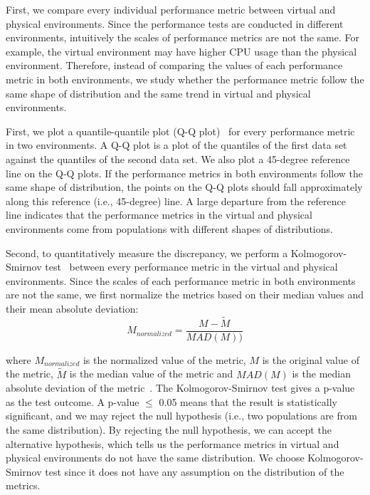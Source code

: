 First, we compare every individual performance metric between virtual and physical environments. Since the performance tests are conducted in different environments, intuitively the scales of performance metrics are not the same. For example, the virtual environment may have higher CPU usage than the physical environment. Therefore, instead of comparing the values of each performance metric in both environments, we study whether the performance metric follow the same shape of distribution and the same trend in virtual and physical environments. 

First, we plot a quantile-quantile plot (Q-Q plot)~\cite{qqplots} for every performance metric in two environments. A Q-Q plot is a plot of the quantiles of the first data set against the quantiles of the second data set. We also plot a 45-degree reference line on the Q-Q plots. If the performance metrics in both environments follow the same shape of distribution, the points on the Q-Q plots should fall approximately along this reference (i.e., 45-degree) line. A large departure from the reference line indicates that the performance metrics in the virtual and physical environments come from populations with different shapes of distributions. 

Second, to quantitatively measure the discrepancy, we perform a Kolmogorov-Smirnov test~\cite{kstest} between every performance metric in the virtual and physical environments. Since the scales of each performance metric in both environments are not the same, we first normalize the metrics based on their median values and their mean absolute deviation: 
\begin{equation}
	\label{equ:mad}
		M_{normalized}=\frac{M-\tilde{M}}{MAD(M))}		
\end{equation}
	
where $M_{normalized}$ is the normalized value of the metric, $M$ is the original value of the metric, $\tilde{M}$ is the median value of the metric and $MAD(M)$ is the median absolute deviation of the metric~\cite{walker1929studies}. The Kolmogorov-Smirnov test gives a p-value as the test outcome. A p-value $\leq$ 0.05 means that the result is statistically significant, and we may reject the null hypothesis (i.e., two populations are from the same distribution). By rejecting the null hypothesis, we can accept the alternative hypothesis, which tells us the performance metrics in virtual and physical environments do not have the same distribution. We choose Kolmogorov-Smirnov test since it does not have any assumption on the distribution of the metrics.

